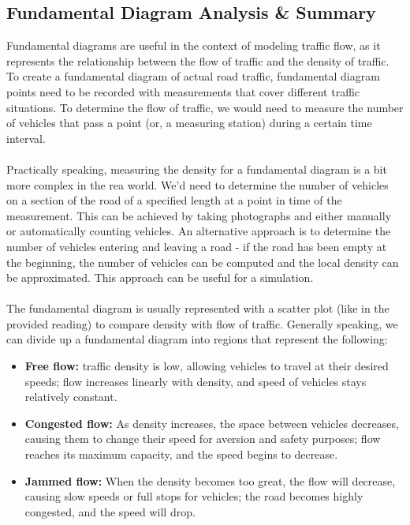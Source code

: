 \documentclass{article}
\begin{document}
\subsection{Fundamental Diagram Analysis \& Summary}
Fundamental diagrams are useful in the context of modeling traffic flow, as it represents the relationship between the flow of traffic and the density of traffic. To create a fundamental diagram of actual road traffic, fundamental diagram points need to be recorded with measurements that cover different traffic situations. To determine the flow of traffic, we would need to measure the number of vehicles that pass a point (or, a measuring station) during a certain time interval. \\ \\
Practically speaking, measuring the density for a fundamental diagram is a bit more complex in the rea world. We'd need to determine the number of vehicles on a section of the road of a specified length at a point in time of the measurement. This can be achieved by taking photographs and either manually or automatically counting vehicles. An alternative approach is to determine the number of vehicles entering and leaving a road - if the road has been empty at the beginning, the number of vehicles can be computed and the local density can be approximated. This approach can be useful for a simulation. \\ \\
The fundamental diagram is usually represented with a scatter plot (like in the provided reading) to compare density with flow of traffic. Generally speaking, we can divide up a fundamental diagram into regions that represent the following: 
\begin{itemize}
    \item 
    \textbf{Free flow:} traffic density is low, allowing vehicles to travel at their desired speeds; flow increases linearly with density, and speed of vehicles stays relatively constant.

    \item 
    \textbf{Congested flow:} As density increases, the space between vehicles decreases, causing them to change their speed for aversion and safety purposes; flow reaches its maximum capacity, and the speed begins to decrease.

    \item 
    \textbf{Jammed flow:} When the density becomes too great, the flow will decrease, causing slow speeds or full stops for vehicles; the road becomes highly congested, and the speed will drop.
\end{itemize}
\end{document}
